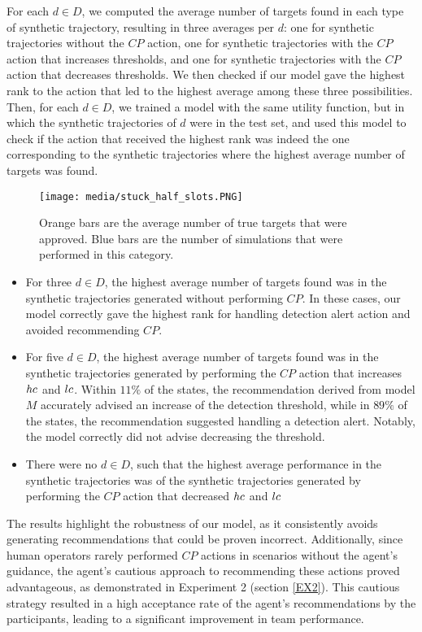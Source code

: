 For each $d \in D$, we computed the average number of targets found in each type of synthetic trajectory, resulting in three averages per $d$: one for synthetic trajectories without the $CP$ action, one for synthetic trajectories with the $CP$ action that increases thresholds, and one for synthetic trajectories with the $CP$ action that decreases thresholds. We then checked if our model gave the highest rank to the action that led to the highest average among these three possibilities.
Then, for each $d \in D$, we trained a model with the same utility function, but in which the synthetic trajectories of $d$ were in the test set, and used this model to check if the action that received the highest rank was indeed the one corresponding to the synthetic trajectories where the highest average number of targets was found.
\begin{figure}[tbp]
    \centering
    \texttt{[image: media/stuck\_half\_slots.PNG]}
    
    \caption{Orange bars are the average number of true targets that were approved. Blue bars are the number of simulations that were performed in this category.}
    \label{fig:stuck-half-label}

\end{figure}
\begin{itemize}[leftmargin=10pt,topsep=0pt]
    \item For three $d\in D$, the highest average number of targets found was in the synthetic trajectories generated without performing $CP$. In these cases, our model correctly gave the highest rank for handling detection alert action and avoided recommending $CP$.
\item For five  $d\in D$, the highest average number of targets found was in the synthetic trajectories generated by performing the $CP$ action that increases $hc$ and $lc$.
Within $11\%$ of the states, the recommendation derived from model $M$ accurately advised an increase of the detection threshold, while in $89\%$ of the states, the recommendation suggested handling a detection alert. 
Notably, the model correctly did not advise decreasing the threshold.
    
    \item  There were no  $d\in D$, such that the highest average performance in the synthetic trajectories was of the  synthetic trajectories generated by performing the $CP$ action that decreased $hc$ and $lc$
\end{itemize}
The results highlight the robustness of our model, as it consistently avoids generating recommendations that could be proven incorrect. Additionally, since human operators rarely performed $CP$ actions in scenarios without the agent's guidance, the agent’s cautious approach to recommending these actions proved advantageous, as demonstrated in Experiment 2 (section \ref{EX2}). This cautious strategy resulted in a high acceptance rate of the agent’s recommendations by the participants, leading to a significant improvement in team performance.

